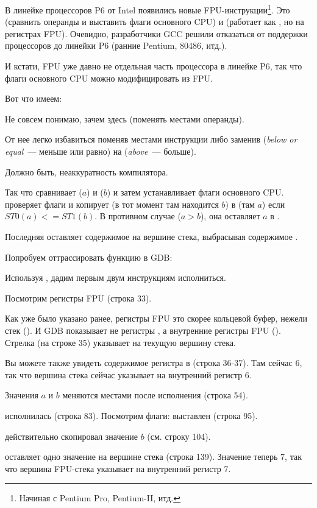 \label{gcc481_o3}

В линейке процессоров P6 от Intel 
появились новые FPU-инструкции\footnote{Начиная с Pentium Pro, Pentium-II, итд.}.
Это  (сравнить операнды и выставить флаги основного CPU) и
 (работает как , но на регистрах FPU).
Очевидно, разработчики GCC решили отказаться от поддержки процессоров до линейки P6 (ранние Pentium, 80486, итд.).

И кстати, FPU уже давно не отдельная часть процессора в линейке P6, так что флаги основного CPU можно модифицировать из FPU.

Вот что имеем:



Не совсем понимаю, зачем здесь  (поменять местами операнды).

От нее легко избавиться поменяв местами инструкции \FLD либо заменив 
 (\emph{below or equal}~--- меньше или равно) на 
 (\emph{above}~--- больше).

Должно быть, неаккуратность компилятора.

Так что  сравнивает  ($a$) и  ($b$) 
и затем устанавливает флаги основного CPU.
 проверяет флаги и копирует  
(в тот момент там находится $b$) в 
 (там $a$) если $ST0 (a) <= ST1 (b)$.
В противном случае ($a>b$), она оставляет $a$ в .

Последняя \FSTP оставляет содержимое  на вершине стека, выбрасывая содержимое .

Попробуем оттрассировать функцию в GDB:



Используя , дадим первым двум инструкциям \FLD исполниться.

Посмотрим регистры FPU (строка 33).

Как уже было указано ранее, регистры FPU это скорее кольцевой буфер, нежели стек ().
И GDB показывает не регистры , а внутренние регистры FPU (). 
Стрелка (на строке 35) указывает на текущую вершину стека.

Вы можете также увидеть содержимое регистра  в  (строка 36-37). Там сейчас 6, так что
вершина стека сейчас указывает на внутренний регистр 6.

Значения $a$ и $b$ меняются местами после исполнения  (строка 54).

 исполнилась (строка 83).
Посмотрим флаги: \CF выставлен (строка 95).

 действительно скопировал значение $b$ (см. строку 104).

\FSTP оставляет одно значение на вершине стека (строка 139).
Значение  теперь 7, так что вершина FPU-стека указывает на внутренний регистр 7.
